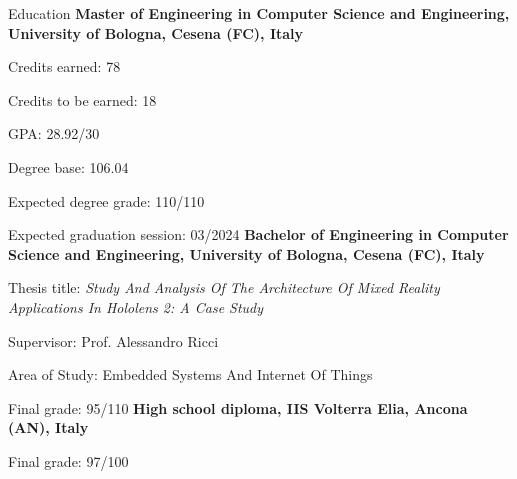 \begin{rubric}{Education}
%
	\textbf{Master of Engineering in Computer Science and Engineering, University of Bologna, Cesena (FC), Italy}
	\par Credits earned: 78
	\par Credits to be earned: 18
	\par GPA: 28.92/30
	\par Degree base: 106.04
	\par Expected degree grade: 110/110
	\par Expected graduation session: 03/2024
%
\entry*[2018 -- 2021]%
	\textbf{Bachelor of Engineering in Computer Science and Engineering, University of Bologna, Cesena (FC), Italy}
	\par Thesis title: \emph{Study And Analysis Of The Architecture Of Mixed Reality Applications In Hololens 2: A Case Study}
	\par Supervisor: Prof. Alessandro Ricci
	\par Area of Study: Embedded Systems And Internet Of Things
	\par Final grade: 95/110
% 
\entry*[2013 -- 2018]%
	\textbf{High school diploma, IIS Volterra Elia, Ancona (AN), Italy}
	\par Final grade: 97/100
\end{rubric}